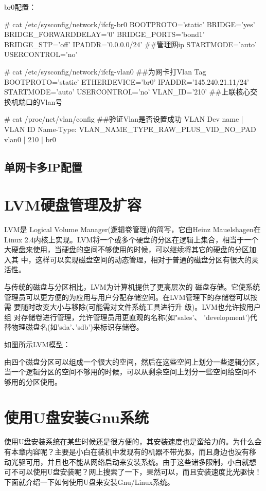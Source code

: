 br0配置：

\begin{code}
# cat /etc/sysconfig/network/ifcfg-br0
BOOTPROTO='static'
BRIDGE='yes'
BRIDGE_FORWARDDELAY='0'
BRIDGE_PORTS='bond1'
BRIDGE_STP='off'
IPADDR='0.0.0.0/24'    	##管理网ip
STARTMODE='auto'
USERCONTROL='no'

# cat /etc/sysconfig/network/ifcfg-vlan0     ##为网卡打Vlan Tag
BOOTPROTO='static'
ETHERDEVICE='br0'
IPADDR='145.240.21.11/24'
STARTMODE='auto'
USERCONTROL='no'
VLAN_ID='210'                       ##上联核心交换机端口的Vlan号

# cat /proc/net/vlan/config         ##验证Vlan是否设置成功
VLAN Dev name | VLAN ID
Name-Type: VLAN_NAME_TYPE_RAW_PLUS_VID_NO_PAD
vlan0         | 210 | br0
\end{code}

\section{单网卡多IP配置}
\label{sec:SingleCardMultiIP}

\chapter{LVM硬盘管理及扩容}

LVM是 Logical Volume Manager(逻辑卷管理)的简写，它由Heinz Mauelshagen在
Linux 2.4内核上实现。LVM将一个或多个硬盘的分区在逻辑上集合，相当于一个
大硬盘来使用，当硬盘的空间不够使用的时候，可以继续将其它的硬盘的分区加
入其 中，这样可以实现磁盘空间的动态管理，相对于普通的磁盘分区有很大的灵
活性。
 
与传统的磁盘与分区相比，LVM为计算机提供了更高层次的 磁盘存储。它使系统
管理员可以更方便的为应用与用户分配存储空间。在LVM管理下的存储卷可以按需
要随时改变大小与移除(可能需对文件系统工具进行升 级)。LVM也允许按用户组
对存储卷进行管理，允许管理员用更直观的名称(如"sales'、 'development')代
替物理磁盘名(如'sda'、'sdb')来标识存储卷。
 
如图所示LVM模型：
 
由四个磁盘分区可以组成一个很大的空间，然后在这些空间上划分一些逻辑分区，
当一个逻辑分区的空间不够用的时候，可以从剩余空间上划分一些空间给空间不
够用的分区使用。

\chapter{使用U盘安装Gnu系统}

使用U盘安装系统在某些时候还是很方便的，其安装速度也是蛮给力的。为什么会
有本章内容呢？主要是小白在装机中发现有的机器不带光驱，而且身边也没有移
动光驱可用，并且也不能从网络启动来安装系统。由于这些诸多限制，小白就想
可不可以使用U盘安装呢？网上搜索了一下，果然可以，而且安装速度比光驱快！
下面就介绍一下如何使用U盘来安装Gnu/Linux系统。

